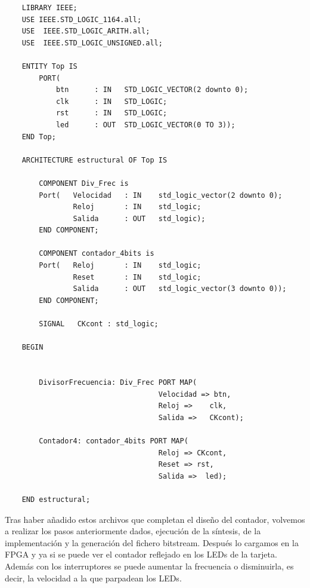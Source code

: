 \begin{lstlisting}
    LIBRARY IEEE;
    USE IEEE.STD_LOGIC_1164.all;
    USE  IEEE.STD_LOGIC_ARITH.all;
    USE  IEEE.STD_LOGIC_UNSIGNED.all;
    
    ENTITY Top IS
        PORT(
            btn      : IN	STD_LOGIC_VECTOR(2 downto 0);
            clk		 : IN	STD_LOGIC;
            rst   	 : IN   STD_LOGIC;
            led      : OUT	STD_LOGIC_VECTOR(0 TO 3));
    END Top;
    
    ARCHITECTURE estructural OF Top IS
    
        COMPONENT Div_Frec is 
        Port(	Velocidad 	: IN 	std_logic_vector(2 downto 0);
                Reloj	    : IN	std_logic;
                Salida		: OUT	std_logic);
        END COMPONENT;
    
        COMPONENT contador_4bits is 
        Port(	Reloj		: IN	std_logic;
                Reset		: IN	std_logic;
                Salida	    : OUT	std_logic_vector(3 downto 0));
        END COMPONENT;
            
        SIGNAL   CKcont : std_logic;
    
    BEGIN
        
    
        DivisorFrecuencia: Div_Frec PORT MAP(
                                    Velocidad => btn,
                                    Reloj =>    clk,
                                    Salida =>   CKcont);
                                    
        Contador4: contador_4bits PORT MAP(
                                    Reloj => CKcont,
                                    Reset => rst,
                                    Salida =>  led);	
    
    END estructural;
\end{lstlisting}

Tras haber añadido estos archivos que completan el diseño del contador, volvemos a realizar los pasos anteriormente dados, 
ejecución de la síntesis, de la implementación y la generación del fichero bitstream. Después lo cargamos en la FPGA y 
ya si se puede ver el contador reflejado en los LEDs de la tarjeta. Además con los interruptores se puede aumentar la frecuencia o 
disminuirla, es decir, la velocidad a la que parpadean los LEDs.
